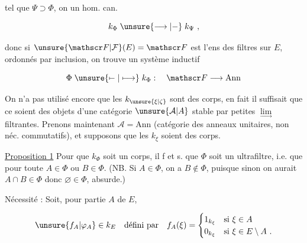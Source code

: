 

tel que $\Psi\supset\Phi$, on  un hom. can.

\[
k_\Phi\mathrel{\unsure{\longrightarrow|-}} k_\Psi\ ,
\]

donc si $\unsure{\mathscr F|\mathcal F}(E)=\mathscr F$ est l'ens des  filtres sur $E$, ordonnés par inclusion, on trouve un système inductif

\[
\Phi\mathrel{\unsure{\mapstochar\relbar|\longmapsto}} k_\Phi:\quad\mathscr F\longrightarrow\mathrm{Ann}
\]

On n'a pas utilisé encore que les $k_{\unsure{\xi|\zeta}}$ sont des corps, en fait il suffisait que ce soient des objets d'une catégorie $\unsure{\mathcal A|A}$ stable par   petites $\underset{\longrightarrow}{\lim}$ filtrantes. Prenons maintenant $\mathcal A=\mathrm{Ann}$ (catégorie des anneaux unitaires, non néc. commutatifs), et supposons que les $k_\xi$ soient des corps.

\uline{Proposition 1}  Pour que $k_\Phi$ soit un corps, il f et s. que $\Phi$ soit un ultrafiltre, i.e. que pour toute   $A\in\Phi$ ou $B\in\Phi$. (NB. Si $A\in\Phi$, on a $B\notin\Phi$, puisque sinon on aurait $A\cap B\in\Phi$ donc $\varnothing\in\Phi$, absurde.)


Nécessité : Soit, pour  partie $A$ de $E$,

\[
\unsure{f_A|\varphi_A}\in k_E\quad\text{défini par}\quad f_A(\xi)=
\begin{cases}
1_{k_\xi}&\text{si }\xi\in A\\
0_{k_\xi}&\text{si }\xi\in E\setminus A\ .
\end{cases}
\]

